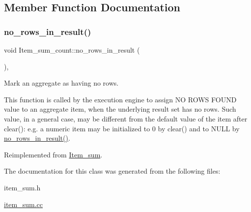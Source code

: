 \subsection{Member Function Documentation}
\mbox{\label{classItem__sum__count_a74ba6f4c6812411fa43d9d942d949863}} 
\subsubsection{\texorpdfstring{no\+\_\+rows\+\_\+in\+\_\+result()}{no\_rows\_in\_result()}}
{\footnotesize\ttfamily void Item\+\_\+sum\+\_\+count\+::no\+\_\+rows\+\_\+in\+\_\+result (\begin{DoxyParamCaption}{ }\end{DoxyParamCaption})\hspace{0.3cm}{\ttfamily [inline]}, {\ttfamily [virtual]}}

Mark an aggregate as having no rows.

This function is called by the execution engine to assign \textquotesingle{}NO R\+O\+WS F\+O\+U\+ND\textquotesingle{} value to an aggregate item, when the underlying result set has no rows. Such value, in a general case, may be different from the default value of the item after \textquotesingle{}clear()\textquotesingle{}\+: e.\+g. a numeric item may be initialized to 0 by clear() and to N\+U\+LL by \mbox{\hyperlink{classItem__sum__count_a74ba6f4c6812411fa43d9d942d949863}{no\+\_\+rows\+\_\+in\+\_\+result()}}. 

Reimplemented from \mbox{\hyperlink{classItem__sum_aba62f301a61ca3e686abf23e109bb0a8}{Item\+\_\+sum}}.



The documentation for this class was generated from the following files\+:\begin{DoxyCompactItemize}
\item 
item\+\_\+sum.\+h\item 
\mbox{\hyperlink{item__sum_8cc}{item\+\_\+sum.\+cc}}\end{DoxyCompactItemize}
